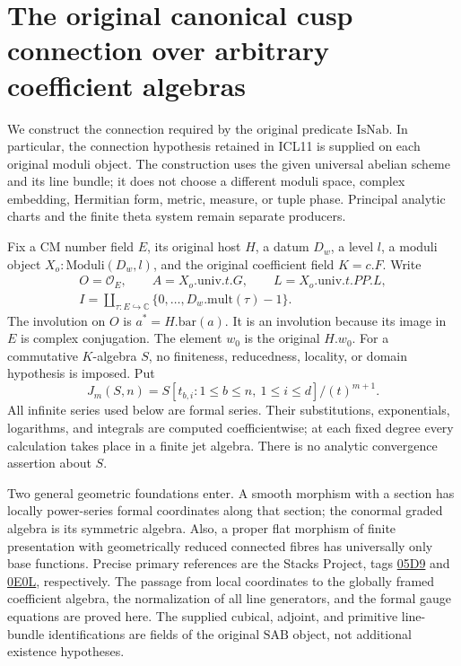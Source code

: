 \section{The original canonical cusp connection over arbitrary coefficient algebras}
\label{sec:cnc-v47}

We construct the connection required by the original predicate
\(\mathrm{IsNab}\).  In particular, the connection hypothesis retained in
ICL11 is supplied on each original moduli object.  The construction uses
the given universal abelian scheme and its line bundle; it does not
choose a different moduli space, complex embedding, Hermitian form,
metric, measure, or tuple phase.  Principal analytic charts and the
finite theta system remain separate producers.

Fix a CM number field \(E\), its original host \(H\), a datum
\(D_w\), a level \(l\), a moduli object \(X_o:\mathrm{Moduli}(D_w,l)\),
and the original coefficient field \(K=c.F\).  Write
\[
 \begin{gathered}
 O=\mathcal O_E,\qquad A=X_o.\mathrm{univ}.t.G,
 \qquad L=X_o.\mathrm{univ}.t.PP.L,\\
 I=\coprod_{\tau:E\hookrightarrow\mathbb C}
            \{0,\ldots,D_w.\mathrm{mult}(\tau)-1\}.
 \end{gathered}
                                                               \tag{CNC.1}
\]
The involution on \(O\) is \(a^*=H.\mathrm{bar}(a)\).  It is an
involution because its image in \(E\) is complex conjugation.  The
element \(w_0\) is the original \(H.w_0\).
For a commutative \(K\)-algebra \(S\), no finiteness, reducedness,
locality, or domain hypothesis is imposed.  Put
\[
 J_m(S,n)=S[t_{b,i}:1\leq b\leq n,\ 1\leq i\leq d]
                    /(t)^{m+1}.
\]
All infinite series used below are formal series.  Their substitutions,
exponentials, logarithms, and integrals are computed coefficientwise;
at each fixed degree every calculation takes place in a finite jet
algebra.  There is no analytic convergence assertion about \(S\).

Two general geometric foundations enter.  A smooth morphism with a
section has locally power-series formal coordinates along that section;
the conormal graded algebra is its symmetric algebra.  Also, a proper
flat morphism of finite presentation with geometrically reduced connected
fibres has universally only base functions.  Precise primary references
are the Stacks Project, tags
\href{https://stacks.math.columbia.edu/tag/05D9}{05D9} and
\href{https://stacks.math.columbia.edu/tag/0E0L}{0E0L}, respectively.
The passage from local coordinates to the globally framed coefficient
algebra, the normalization of all line generators, and the formal gauge
equations are proved here.  The supplied cubical, adjoint, and primitive
line-bundle identifications are fields of the original \(\mathrm{SAB}\)
object, not additional existence hypotheses.

